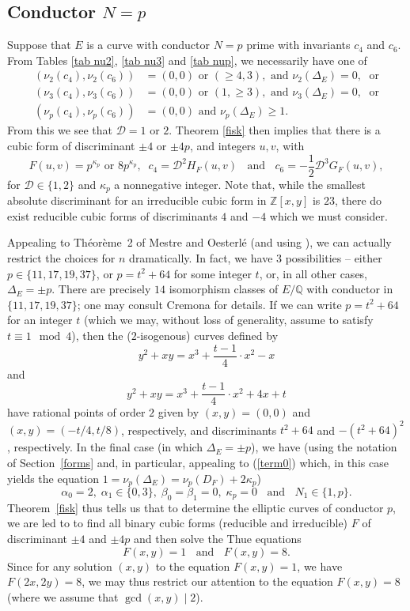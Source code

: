 \subsection{Conductor $N=p$}
Suppose that $E$ is a curve with conductor $N=p$ prime with invariants $c_4$ and $c_6$. From Tables \ref{tab nu2}, \ref{tab nu3} and \ref{tab nup}, we 
necessarily have one of 
\begin{align*}
(\nu_2 (c_4), \nu_2(c_6)) &= (0,0) \mbox{ or } (\geq 4, 3), \mbox{ and } \nu_2 (\Delta_E) = 0,  \; \mbox{ or} \\
(\nu_3 (c_4), \nu_3 (c_6)) &= (0,0) \mbox{ or } (1, \geq 3), \mbox{ and } \nu_3 (\Delta_E) = 0, \; \mbox{ or} \\
(\nu_p(c_4), \nu_p(c_6)) &= (0, 0) \mbox{ and } \nu_p(\Delta_E) \geq 1.
\end{align*}
From this we see that $\mathcal{D}= 1$ or $2$. Theorem \ref{fisk} then implies that there is a cubic form of 
discriminant $\pm 4$ or $\pm 4p$, and integers $u, v$, with
$$
F(u,v) = p^{\kappa_p} \mbox{ or } 8 p^{\kappa_p}, \; \; 
c_4 = \mathcal{D}^2 H_F(u,v)  \; \; \mbox{ and } \; \; 
c_6 = - \frac{1}{2} \mathcal{D}^3 G_F (u,v),
$$
for $\mathcal{D} \in \{1,2\}$ and $\kappa_p$ a nonnegative integer. Note that, while the smallest absolute discriminant for an irreducible cubic form in $\mathbb{Z}[x,y]$ is $23$, there do exist reducible cubic forms of discriminants $4$ and $-4$ which we must consider.

Appealing to Th\'eor\`eme~2 of Mestre and Oesterl\'e \cite{MO} (and using \cite{BCDT}), we can actually restrict the choices for $n$ dramatically. In fact, we 
have 3 possibilities --  either  $p \in \{ 11, 17, 19, 37 \}$, or $p=t^2+64$ for some integer $t$, or, in all other cases, $\Delta_E = \pm p$. There are precisely $14$ isomorphism classes of $E/\mathbb{Q}$ with conductor in $\{ 11, 17, 19, 37 \}$; one may consult Cremona \cite{Cre1} for details. If we can write $p=t^2+64$ for an integer $t$ (which we may, without loss of generality, assume to satisfy $t \equiv 1\mod{4}$),  then the ($2$-isogenous) curves defined by 
$$
 y^2 + xy = x^3 + \frac{t-1}{4} \cdot x^2  - x
$$
and
$$
 y^2 + xy = x^3 + \frac{t-1}{4} \cdot x^2 + 4x + t
$$
have  rational points of order $2$ given by $(x,y)=(0,0)$ and $(x,y) = (-t/4,t/8)$, respectively, and discriminants $t^2+64$ and  $-(t^2+64)^2$, respectively. In the 
final case (in which $\Delta_E=\pm p$), we have (using the notation of Section~\ref{forms} and, in particular, appealing to (\ref{term0}) which, in this case yields the equation $1 = \nu_p(\Delta_E) =  \nu_p (D_F) + 2 \kappa_p$)
$$
\alpha_0 =2, \;  \alpha_1 \in \{ 0, 3 \}, \;  \beta_0=\beta_1=0, \;
\kappa_p = 0 \; \; \mbox{ and } \; \;  N_1  \in \{1,p\}.
$$
Theorem~\ref{fisk} thus tells us that to determine the elliptic curves of conductor $p$, we are led to 
to find all binary cubic forms (reducible and  irreducible) $F$ of discriminant $\pm 4$ and $\pm 4p$ and then solve the 
Thue equations
$$
F(x,y) =1 \; \; \mbox{ and } \; \; F(x,y)=8.
$$
Since for any solution $(x,y)$ to the equation $F(x,y)=1$, we have $F(2x,2y)=8$, we may thus restrict our attention to the equation  $F(x,y)=8$ (where we assume that $\gcd(x,y) \mid 2$). 

